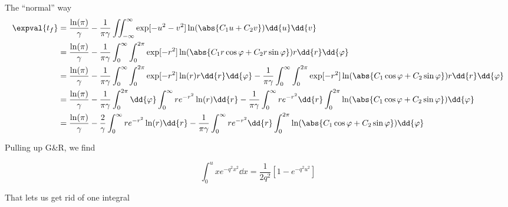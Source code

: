 \begin{answer}
\begin{answerpart}{The ``normal'' way}
    \begin{equation}
      \begin{split}
        \expval{t_f}
        &=
        \frac{\ln(\pi)}{\gamma}
        - 
        \frac{1}{\pi\gamma}
        \iint_{-\infty}^{\infty}
        \exp[-u^2 - v^2]
        \ln(\abs{C_1u + C_2v})
        \dd{u} \dd{v}
        \\
        &=
        \frac{\ln(\pi)}{\gamma}
        - 
        \frac{1}{\pi\gamma}
        \int_{0}^{\infty}
        \int_{0}^{2\pi}
        \exp[-r^2]
        \ln(\abs{C_1r\cos{\varphi} + C_2r\sin{\varphi}})
        r \dd{r} \dd{\varphi}
        \\
        &=
        \frac{\ln(\pi)}{\gamma}
        - 
        \frac{1}{\pi\gamma}
        \int_{0}^{\infty}
        \int_{0}^{2\pi}
        \exp[-r^2]
        \ln(r)
        r \dd{r} \dd{\varphi}
        -
        \frac{1}{\pi\gamma}
        \int_{0}^{\infty}
        \int_{0}^{2\pi}
        \exp[-r^2]
        \ln(\abs{C_1\cos{\varphi} + C_2\sin{\varphi}})
        r \dd{r} \dd{\varphi}
        \\
        &=
        \frac{\ln(\pi)}{\gamma}
        - 
        \frac{1}{\pi\gamma}
        \int_{0}^{2\pi}
        \dd{\varphi}
        \int_{0}^{\infty}
        re^{-r^2}
        \ln(r)
        \dd{r}
        -
        \frac{1}{\pi\gamma}
        \int_{0}^{\infty}
        re^{-r^2}
        \dd{r}
        \int_{0}^{2\pi}
        \ln(\abs{C_1\cos{\varphi} + C_2\sin{\varphi}})
        \dd{\varphi}
        \\
        &=
        \frac{\ln(\pi)}{\gamma}
        - 
        \frac{2}{\gamma}
        \int_{0}^{\infty}
        re^{-r^2}
        \ln(r)
        \dd{r}
        -
        \frac{1}{\pi\gamma}
        \int_{0}^{\infty}
        re^{-r^2}
        \dd{r}
        \int_{0}^{2\pi}
        \ln(\abs{C_1\cos{\varphi} + C_2\sin{\varphi}})
        \dd{\varphi}
        \\
      \end{split}
    \end{equation}

    Pulling up G\&R, we find

    \begin{equation}
      \tag{3.321.4}
      \int_0^uxe^{-q^2x^2} \dd{x} = \frac{1}{2q^2} \left[1 - e^{-q^2u^2}\right]
    \end{equation}\cite[eq 3.321.4]{gr}

    That lets us get rid of one integral


\end{answerpart}
\end{answer}
